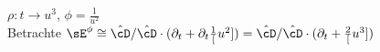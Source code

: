 $\rho:t\rightarrow u^3$, $\phi=\frac{1}{u^2}$\\
Betrachte $\sE^\phi\cong \hat\cD/\hat\cD\cdot
(\partial_t+\partial_t\frac{1}[u^2])=
\hat\cD/\hat\cD\cdot (\partial_t+\frac{2}[u^3])$

